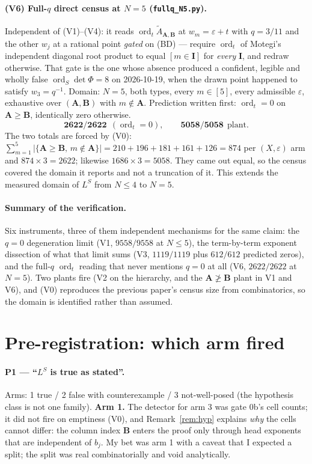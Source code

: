 \documentclass[11pt]{article}
\theoremstyle{plain}
\theoremstyle{definition}
\newcommand{\At}{\widetilde{A}}
\newcommand{\bA}{\mathbf{A}}
\newcommand{\bB}{\mathbf{B}}
\newcommand{\bI}{\mathbf{I}}
\newcommand{\ord}{\operatorname{ord}}
\begin{document}
\paragraph{(V6) Full-$q$ direct census at $N=5$ (\texttt{fullq\_N5.py}).}
Independent of (V1)--(V4): it reads $\ord_t\At_{\bA,\bB}$ at $w_m=\varepsilon+t$
with $q=3/11$ and the other $w_j$ at a rational point \emph{gated} on (BD) ---
require $\ord_t$ of Motegi's independent diagonal root product to equal
$[m\in\bI]$ for \emph{every} $\bI$, and redraw otherwise.  That gate is the one
whose absence produced a confident, legible and wholly false
$\ord_S\det\Phi=8$ on 2026-10-19, when the drawn point happened to satisfy
$w_3=q^{-1}$.  Domain: $N=5$, both types, every $m\in[5]$, every admissible
$\varepsilon$, exhaustive over $(\bA,\bB)$ with $m\notin\bA$.  Prediction written
first: $\ord_t=0$ on $\bA\ge\bB$, identically zero otherwise.
\[
  \textbf{2622/2622}\ \ (\ord_t=0),\qquad
  \textbf{5058/5058}\ \ \text{plant}.
\]
The two totals are forced by (V0): $\sum_{m=1}^{5}|\{\bA\ge\bB,\,m\notin\bA\}|
=210+196+181+161+126=874$ per $(X,\varepsilon)$ arm and $874\times3=2622$;
likewise $1686\times3=5058$.  They came out equal, so the census covered the
domain it reports and not a truncation of it.  This extends the measured domain
of $L^{S}$ from $N\le4$ to $N=5$.

\paragraph{Summary of the verification.}  Six instruments, three of them
independent mechanisms for the same claim: the $q=0$ degeneration limit (V1,
$9558/9558$ at $N\le5$), the term-by-term exponent dissection of what that limit
sums (V3, $1119/1119$ plus $612/612$ predicted zeros), and the full-$q$
$\ord_t$ reading that never mentions $q=0$ at all (V6, $2622/2622$ at $N=5$).
Two plants fire (V2 on the hierarchy, and the $\bA\not\ge\bB$ plant in V1 and
V6), and (V0) reproduces the previous paper's census size from combinatorics, so
the domain is identified rather than assumed.

\section{Pre-registration: which arm fired}

\paragraph{P1 --- ``$L^{S}$ is true as stated''.}
Arms: 1 true / 2 false with counterexample / 3 not-well-posed (the hypothesis
class is not one family).  \textbf{Arm 1.}  The detector for arm 3 was gate 0b's
cell counts; it did not fire on emptiness (V0), and
Remark~\ref{rem:hyp} explains \emph{why} the cells cannot differ: the column index
$\bB$ enters the proof only through head exponents that are independent of
$b_j$.  My bet was arm 1 with a caveat that I expected a split; the split was
real combinatorially and void analytically.
\end{document}
